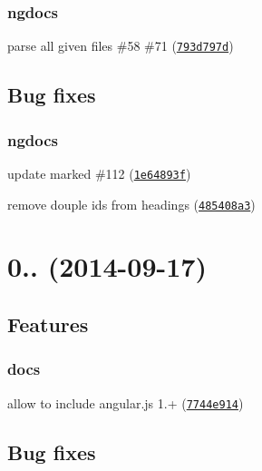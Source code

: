 \subsubsection*{ngdocs}


\begin{DoxyItemize}
\item parse all given files \#58 \#71 (\href{https://github.com/m7r/grunt-ngdocs/commit/793d797d}{\tt 793d797d})
\end{DoxyItemize}

\subsection*{Bug fixes}

\subsubsection*{ngdocs}


\begin{DoxyItemize}
\item update marked \#112 (\href{https://github.com/m7r/grunt-ngdocs/commit/1e64893f}{\tt 1e64893f})
\item remove douple ids from headings (\href{https://github.com/m7r/grunt-ngdocs/commit/485408a3}{\tt 485408a3})
\end{DoxyItemize}

\section*{0.. (2014-\/09-\/17)}

\subsection*{Features}

\subsubsection*{docs}


\begin{DoxyItemize}
\item allow to include angular.\+js 1.+ (\href{https://github.com/m7r/grunt-ngdocs/commit/7744e914}{\tt 7744e914})
\end{DoxyItemize}

\subsection*{Bug fixes}

